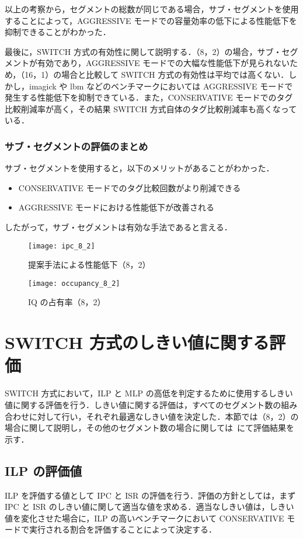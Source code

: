 以上の考察から，セグメントの総数が同じである場合，サブ・セグメントを使用することによって，AGGRESSIVE モードでの容量効率の低下による性能低下を抑制できることがわかった．

最後に，SWITCH 方式の有効性に関して説明する．（8，2）の場合，サブ・セグメントが有効であり，AGGRESSIVE モードでの大幅な性能低下が見られないため，（16，1）の場合と比較して SWITCH 方式の有効性は平均では高くない．しかし，imagick や lbm などのベンチマークにおいては AGGRESSIVE モードで発生する性能低下を抑制できている．また，CONSERVATIVE モードでのタグ比較削減率が高く，その結果 SWITCH 方式自体のタグ比較削減率も高くなっている．

\subsubsection{サブ・セグメントの評価のまとめ}
サブ・セグメントを使用すると，以下のメリットがあることがわかった．
\begin{itemize}
  \item CONSERVATIVE モードでのタグ比較回数がより削減できる
  \item AGGRESSIVE モードにおける性能低下が改善される
\end{itemize}
したがって，サブ・セグメントは有効な手法であると言える．

\begin{figure}[htb]
  \centering
  \texttt{[image: ipc\_8\_2]}
  \caption{提案手法による性能低下（8，2）}
  \label{fig:ipc_8_2}
\end{figure}

\begin{figure}[htb]
  \centering
  \texttt{[image: occupancy\_8\_2]}
  \caption{IQ の占有率（8，2）}
  \label{fig:occupancy_8_2}
\end{figure}

\clearpage

\section{SWITCH 方式のしきい値に関する評価}
\label{sec:eval_threshold}
SWITCH 方式において，ILP と MLP の高低を判定するために使用するしきい値に関する評価を行う．しきい値に関する評価は，すべてのセグメント数の組み合わせに対して行い，それぞれ最適なしきい値を決定した．本節では（8，2）の場合に関して説明し，その他のセグメント数の場合に関しては~にて評価結果を示す．

\subsection{ILP の評価値}
ILP を評価する値として IPC と ISR の評価を行う．評価の方針としては，まず IPC と ISR のしきい値に関して適当な値を求める．適当なしきい値は，しきい値を変化させた場合に，ILP の高いベンチマークにおいて CONSERVATIVE モードで実行される割合を評価することによって決定する．

